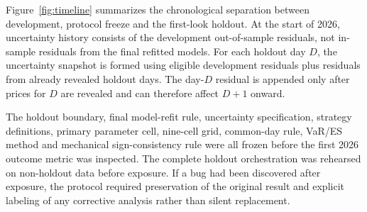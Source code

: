 Figure~\ref{fig:timeline} summarizes the chronological separation between development, protocol freeze and the first-look holdout. At the start of 2026, uncertainty history consists of the development out-of-sample residuals, not in-sample residuals from the final refitted models. For each holdout day \(D\), the uncertainty snapshot is formed using eligible development residuals plus residuals from already revealed holdout days. The day-\(D\) residual is appended only after prices for \(D\) are revealed and can therefore affect \(D+1\) onward.

The holdout boundary, final model-refit rule, uncertainty specification, strategy definitions, primary parameter cell, nine-cell grid, common-day rule, VaR/ES method and mechanical sign-consistency rule were all frozen before the first 2026 outcome metric was inspected. The complete holdout orchestration was rehearsed on non-holdout data before exposure. If a bug had been discovered after exposure, the protocol required preservation of the original result and explicit labeling of any corrective analysis rather than silent replacement.
